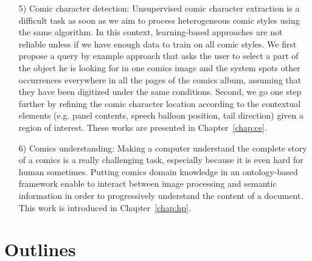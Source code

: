 \begin{itemize}
	
	\item [5)] Comic character detection: Unsupervised comic character extraction is a difficult task as soon as we aim to process heterogeneous comic styles using the same algorithm.
	In this context, learning-based approaches are not reliable unless if we have enough data to train on all comic styles. 
	We first propose a query by example approach that asks the user to select a part of the object he is looking for in one comics image and the system spots other occurrences everywhere in all the pages of the comics album, assuming that they have been digitized under the same conditions.
	Second, we go one step further by refining the comic character location according to the contextual elements (e.g. panel contents, speech balloon position, tail direction) given a region of interest.
	These works are presented in Chapter~\ref{chap:ce}.

	\item [6)] Comics understanding: Making a computer understand the complete story of a comics is a really challenging task, especially because it is even hard for human sometimes.
	Putting comics domain knowledge in an ontology-based framework enable to interact between image processing and semantic information in order to progressively understand the content of a document.
	This work is introduced in Chapter~\ref{chap:hp}.


\end{itemize}


\section{Outlines}


